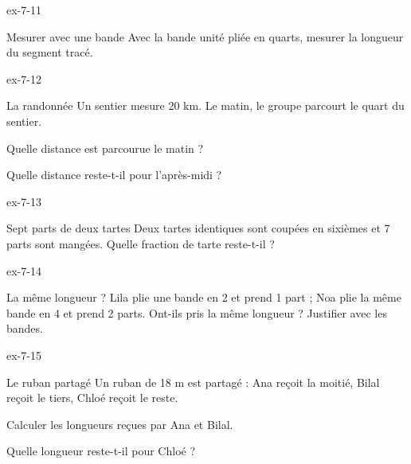 \begin{blocLivre}{ex-7-11}\begin{exercice}[3]{Mesurer avec une bande}
Avec la bande unité pliée en quarts, mesurer la longueur du segment tracé.
\label{fig-ex-7-11}
\end{exercice}\end{blocLivre}
\begin{blocLivre}{ex-7-12}\begin{exercice}[3]{La randonnée}
Un sentier mesure 20 km. Le matin, le groupe parcourt le quart du sentier.\begin{questions}
\item Quelle distance est parcourue le matin ?
\item Quelle distance reste-t-il pour l’après-midi ?
\end{questions}
\end{exercice}\end{blocLivre}
\begin{blocLivre}{ex-7-13}\begin{exercice}[3]{Sept parts de deux tartes}
Deux tartes identiques sont coupées en sixièmes et 7 parts sont mangées. Quelle fraction de tarte reste-t-il ?
\end{exercice}\end{blocLivre}
\begin{blocLivre}{ex-7-14}\begin{exercice}[3]{La même longueur ?}
Lila plie une bande en 2 et prend 1 part ; Noa plie la même bande en 4 et prend 2 parts. Ont-ils pris la même longueur ? Justifier avec les bandes.
\label{fig-ex-7-14}
\end{exercice}\end{blocLivre}
\begin{blocLivre}{ex-7-15}\begin{exercice}[3]{Le ruban partagé}
Un ruban de 18 m est partagé : Ana reçoit la moitié, Bilal reçoit le tiers, Chloé reçoit le reste.\begin{questions}
\item Calculer les longueurs reçues par Ana et Bilal.
\item Quelle longueur reste-t-il pour Chloé ?
\end{questions}
\end{exercice}\end{blocLivre}

\clearpage
